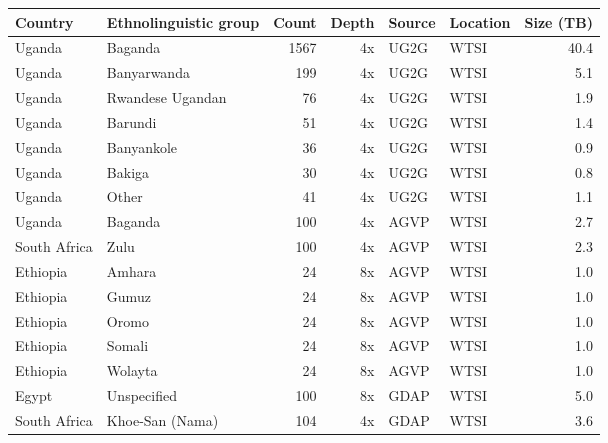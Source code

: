 \begin{table}[htp]
\centering
\begin{tabular}{llrrllr}
\hline
Country & Ethnolinguistic group & Count & Depth & Source & Location & Size (TB) \\
\hline
Uganda & Baganda & 1567 & 4x & UG2G & WTSI & 40.4 \\
Uganda & Banyarwanda & 199 & 4x & UG2G & WTSI & 5.1 \\
Uganda & Rwandese Ugandan & 76 & 4x & UG2G & WTSI & 1.9 \\
Uganda & Barundi & 51 & 4x & UG2G & WTSI & 1.4 \\
Uganda & Banyankole & 36 & 4x & UG2G & WTSI & 0.9 \\
Uganda & Bakiga & 30 & 4x & UG2G & WTSI & 0.8 \\
Uganda & Other & 41 & 4x & UG2G & WTSI & 1.1 \\
Uganda & Baganda & 100 & 4x & AGVP & WTSI & 2.7 \\
South Africa & Zulu & 100 & 4x & AGVP & WTSI & 2.3 \\
Ethiopia & Amhara & 24 & 8x & AGVP & WTSI & 1.0 \\
Ethiopia & Gumuz & 24 & 8x & AGVP & WTSI & 1.0 \\
Ethiopia & Oromo & 24 & 8x & AGVP & WTSI & 1.0 \\
Ethiopia & Somali & 24 & 8x & AGVP & WTSI & 1.0 \\
Ethiopia & Wolayta & 24 & 8x & AGVP & WTSI & 1.0 \\
Egypt & Unspecified & 100 & 8x & GDAP & WTSI & 5.0 \\
South Africa & Khoe-San (Nama) & 104 & 4x & GDAP & WTSI & 3.6 \\

\end{tabular}
\end{table}
